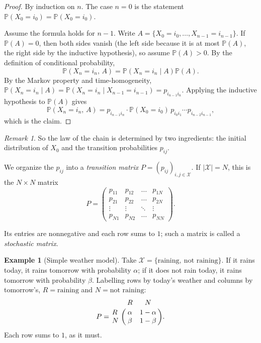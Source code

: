 \documentclass[11pt]{article}
\theoremstyle{definition}
\newtheorem{example}[theorem]{Example}
\theoremstyle{remark}
\newtheorem{remark}[theorem]{Remark}
\newcommand{\PP}{\mathbb{P}}
\newcommand{\X}{\mathcal{X}}
\begin{document}
\begin{proof}
By induction on \(n\). The case \(n = 0\) is the statement \(\PP(X_0 = i_0) = \PP(X_0 = i_0)\).

Assume the formula holds for \(n-1\). Write \(A = \{X_0 = i_0, \dots, X_{n-1} = i_{n-1}\}\).
If \(\PP(A) = 0\), then both sides vanish (the left side because it is at most \(\PP(A)\), the right side by the
inductive hypothesis), so assume \(\PP(A) > 0\). By the definition of conditional probability,
\begin{equation*}
    \PP\!\left(X_n = i_n,\, A\right) = \PP\!\left(X_n = i_n \mid A\right) \PP(A).
\end{equation*}
By the Markov property and time-homogeneity, \(\PP(X_n = i_n \mid A) = \PP(X_n = i_n \mid X_{n-1} = i_{n-1}) = p_{i_{n-1} i_n}\).
Applying the inductive hypothesis to \(\PP(A)\) gives
\begin{equation*}
    \PP\!\left(X_n = i_n,\, A\right)
    = p_{i_{n-1} i_n} \cdot \PP(X_0 = i_0)\, p_{i_0 i_1} \cdots p_{i_{n-2} i_{n-1}},
\end{equation*}
which is the claim. \qedhere
\end{proof}

\begin{remark}
So the law of the chain is determined by two ingredients: the initial distribution of \(X_0\) and the transition
probabilities \(p_{ij}\).
\end{remark}

We organize the \(p_{ij}\) into a \emph{transition matrix} \(P = (p_{ij})_{i, j \in \X}\). If \(|\X| = N\), this is
the \(N \times N\) matrix
\begin{equation*}
    P = \begin{pmatrix}
        p_{11} & p_{12} & \dots  & p_{1N} \\
        p_{21} & p_{22} & \dots  & p_{2N} \\
        \vdots & \vdots & \ddots & \vdots \\
        p_{N1} & p_{N2} & \dots  & p_{NN}
    \end{pmatrix}.
\end{equation*}

Its entries are nonnegative and each row sums to \(1\); such a matrix is called a \emph{stochastic matrix}.

\begin{example}[Simple weather model]
Take \(\X = \{\text{raining},\ \text{not raining}\}\). If it rains today, it rains tomorrow with probability
\(\alpha\); if it does not rain today, it rains tomorrow with probability \(\beta\). Labelling rows by today's
weather and columns by tomorrow's, \(R = \text{raining}\) and \(N = \text{not raining}\):
\begin{equation*}
    P = \bordermatrix{
        ~ & R & N \cr
        R & \alpha & 1 - \alpha \cr
        N & \beta  & 1 - \beta  \cr
    }.
\end{equation*}
Each row sums to \(1\), as it must.
\end{example}
\end{document}
